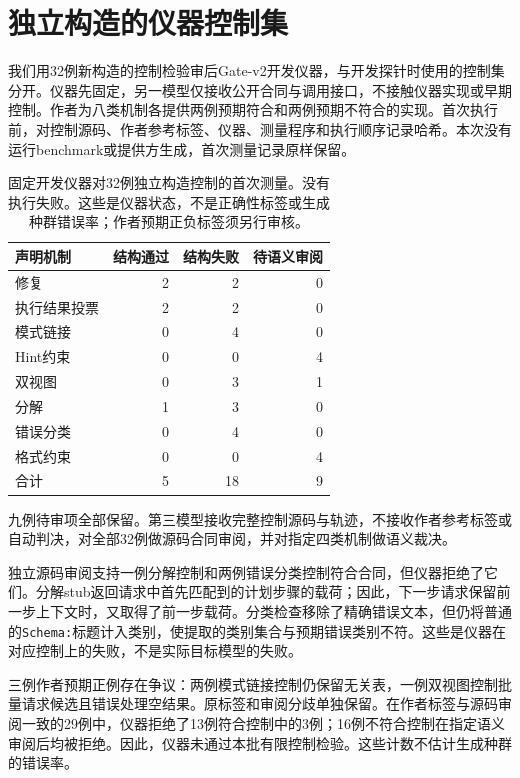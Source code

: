 \section{独立构造的仪器控制集}\label{app:gatecontrols}
我们用32例新构造的控制检验审后Gate-v2开发仪器，与开发探针时使用的控制集分开。仪器先固定，另一模型仅接收公开合同与调用接口，不接触仪器实现或早期控制。作者为八类机制各提供两例预期符合和两例预期不符合的实现。首次执行前，对控制源码、作者参考标签、仪器、测量程序和执行顺序记录哈希。本次没有运行benchmark或提供方生成，首次测量记录原样保留。

\begin{table}[h]
\centering\small
\begin{tabular}{lrrr}\toprule
声明机制 & 结构通过 & 结构失败 & 待语义审阅 \\\midrule
修复 & 2 & 2 & 0 \\
执行结果投票 & 2 & 2 & 0 \\
模式链接 & 0 & 4 & 0 \\
Hint约束 & 0 & 0 & 4 \\
双视图 & 0 & 3 & 1 \\
分解 & 1 & 3 & 0 \\
错误分类 & 0 & 4 & 0 \\
格式约束 & 0 & 0 & 4 \\\midrule
合计 & 5 & 18 & 9 \\\bottomrule
\end{tabular}
\caption{固定开发仪器对32例独立构造控制的首次测量。没有执行失败。这些是仪器状态，不是正确性标签或生成种群错误率；作者预期正负标签须另行审核。}\label{tab:gatecontrols}
\end{table}

九例待审项全部保留。第三模型接收完整控制源码与轨迹，不接收作者参考标签或自动判决，对全部32例做源码合同审阅，并对指定四类机制做语义裁决。

独立源码审阅支持一例分解控制和两例错误分类控制符合合同，但仪器拒绝了它们。分解stub返回请求中首先匹配到的计划步骤的载荷；因此，下一步请求保留前一步上下文时，又取得了前一步载荷。分类检查移除了精确错误文本，但仍将普通的\texttt{Schema:}标题计入类别，使提取的类别集合与预期错误类别不符。这些是仪器在对应控制上的失败，不是实际目标模型的失败。

三例作者预期正例存在争议：两例模式链接控制仍保留无关表，一例双视图控制批量请求候选且错误处理空结果。原标签和审阅分歧单独保留。在作者标签与源码审阅一致的29例中，仪器拒绝了13例符合控制中的3例；16例不符合控制在指定语义审阅后均被拒绝。因此，仪器未通过本批有限控制检验。这些计数不估计生成种群的错误率。


